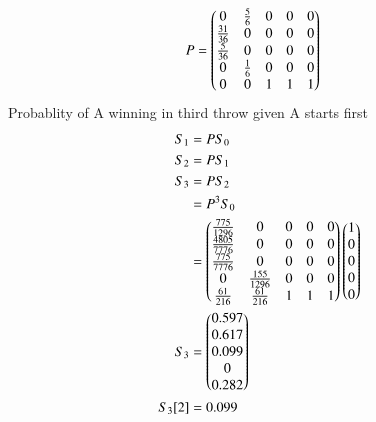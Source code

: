 \documentclass[journal,12pt,twocolumn]{IEEEtran}
\begin{document}
\begin{align}
P &= \begin{pmatrix}
    0 & \frac{5}{6} & 0 & 0 & 0 \\
    \frac{31}{36} & 0 & 0 & 0 & 0 \\
    \frac{5}{36} & 0 & 0 & 0 & 0 \\
    0 & \frac{1}{6} & 0 & 0 & 0 \\
    0 & 0 & 1 & 1 & 1\\
\end{pmatrix}
\end{align}
Probablity of A winning in third throw given A starts first\\
\begin{align}
S_1 &= PS_0\\
S_2 &= PS_1\\
S_3 &= PS_2\\
    &= P^3S_0\\
&= \begin{pmatrix}
    \frac{775}{1296} & 0 & 0 & 0 & 0 \\
    \frac{4805}{7776} & 0 & 0 & 0 & 0 \\
    \frac{775}{7776} & 0 & 0 & 0 & 0 \\
    0 & \frac{155}{1296} & 0 & 0 & 0 \\
    \frac{61}{216} & \frac{61}{216} & 1 & 1 & 1
\end{pmatrix}
\begin{pmatrix} 1\\ 0\\0\\0\\0\\\end{pmatrix}\\
S_3 &= \begin{pmatrix}0.597\\ 0.617\\0.099\\0\\0.282\end{pmatrix}\\
S_3[2] &= 0.099
\end{align}
\end{document}
